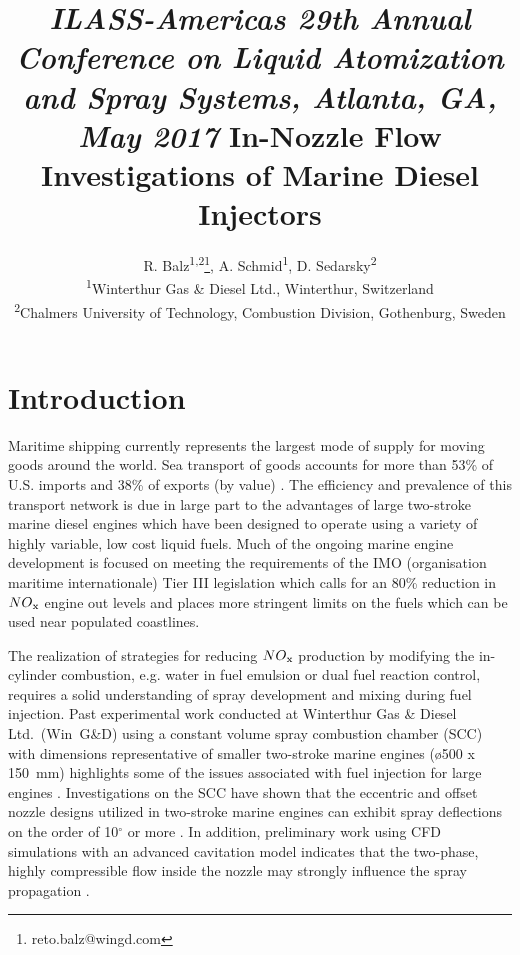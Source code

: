 \documentclass[letterpaper,twocolumn,10pt]{ilass}
\title{\vspace{-0.25in}
      {\small \em
       ILASS-Americas 29th Annual Conference on Liquid Atomization and Spray Systems,
       Atlanta, GA, May 2017} \newline\newline
      {\large\bf In-Nozzle Flow Investigations of Marine Diesel Injectors} }
\author{\large
        R. Balz\textsuperscript{1,2}\footnote{reto.balz@wingd.com},
				A. Schmid\textsuperscript{1},
				D. Sedarsky\textsuperscript{2}\\
				\textsuperscript{1}Winterthur Gas \& Diesel Ltd.,
				Winterthur,	Switzerland\\
				\textsuperscript{2}Chalmers University of Technology,
				Combustion Division, Gothenburg, Sweden}
\date{\normalsize  \centerline{\bf Abstract} \vspace{0.05in}
\begin{minipage}{6.5in} \normalsize
Injector geometries of large marine two-stroke diesel engines differ extensively from
configurations typically used in diesel engines for automotive applications.
In marine engines, the fuel enters the combustion volume radially, supplied by
multi-hole injectors with asymmetrically positioned orifices facing in similar directions. Due to this setup, the nominal direction of the orifice group
is also eccentric with respect to the central axis of the injector.
%
Experiments have shown that the sprays formed by this arrangement are asymmetric
with respect to the axis at each orifice. These strong deviations can lead
to wall wetting which increases fuel consumption, emissions, component temperatures and
contributes to loss of lubrication at the cylinder wall.
In order to investigate the in-nozzle flow and how it affects the spray morphology in this
design, experiments were carried out using transparent nozzles at injection pressures and
air densities of up to 50~MPa and 35~kg/m$^3$, respectively.
The experiments were performed with diesel fuel in a newly built ambient temperature
spray chamber which was designed to cope with significant spray backsplash.
The results discussed here were generated using an orthogonally arranged 0.75~mm diameter
mono-hole injector which matches the hole size and geometry used in large marine two-stroke
diesel engines.
%
High-speed shadowgraphy using a far-field microscope was applied to visualize cavitation
within the nozzle during the complete injection process. These imaging results are used to
compute statistical evaluations of cavitation in the nozzle over a range of conditions.
\end{minipage} \vspace{-0.25in}}
\begin{document}
\ifpdf
{}
\else
{}
\fi

\maketitle

\clearpage

\setcounter{page}{2}


\section*{Introduction}
Maritime shipping currently represents the largest mode of supply for moving goods around the
world. Sea transport of goods accounts for more than 53\% of U.S. imports and 38\%
of exports (by value) \cite{Blank2012}. The efficiency and prevalence of this transport network
is due in large part to the advantages of large two-stroke marine diesel engines which have
been designed to operate using a variety of highly variable, low cost liquid fuels. 
%
Much of the ongoing marine engine development is focused on meeting the requirements of the
IMO (organisation maritime internationale) Tier III legislation which calls for an 80\%
reduction in $NO\textsubscript{x}$ engine out levels and places more stringent limits on
the fuels which can be used near populated coastlines.
%

The realization of strategies for reducing $NO\textsubscript{x}$ production by
modifying the in-cylinder combustion, e.g. water in fuel emulsion or dual fuel reaction control,
requires a solid understanding of spray development and mixing during fuel injection.
%
Past experimental work conducted at Winterthur Gas \& Diesel Ltd.~(Win~G\&D) using a
constant volume spray combustion chamber (SCC) with dimensions representative of
smaller two-stroke marine engines (\o 500 x 150~mm) highlights some of the issues
associated with fuel injection for large engines \cite{Herrmann2011}.
Investigations on the SCC have shown that the eccentric and offset nozzle designs utilized
in two-stroke marine engines can exhibit spray deflections on the order of
10$^{\circ}$ or more \cite{Schmid2013}.
%
In addition, preliminary work using CFD simulations with an advanced cavitation model
indicates that the two-phase, highly compressible flow inside the nozzle may strongly
influence the spray propagation \cite{Schmid2014}.
%
\end{document}
